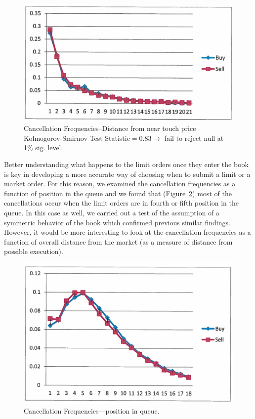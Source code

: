 	\begin{figure}[!ht]
   	\centering
   	\includegraphics[width=\textwidth]{chapters/chapter_trade_data_models/figures/canfreqnear.png} 
   	\caption{Cancellation Frequencies--Distance from near touch price \\ Kolmogorov-Smirnov Test Statistic$=0.83\to$ fail to reject null at 1\% sig. level. \label{fig:canfreqnear}}
	\end{figure}


Better understanding what happens to the limit orders once they enter the book is key in developing a more accurate way of choosing when to submit a limit or a market order. For this reason, we examined the cancellation frequencies as a function of position in the queue and we found that (Figure~\ref{fig:canfreq}) most of the cancellations occur when the limit orders are in fourth or fifth position in the queue. In this case as well, we carried out a test of the assumption of a symmetric behavior of the book which confirmed previous similar findings. However, it would be more interesting to look at the cancellation frequencies as a function of overall distance from the market (as a measure of distance from possible execution). 
	\begin{figure}[!ht]
   	\centering
   	\includegraphics[width=\textwidth]{chapters/chapter_trade_data_models/figures/canfreq.png} 
   	\caption{Cancellation Frequencies---position in queue. \label{fig:canfreq}}
	\end{figure}



